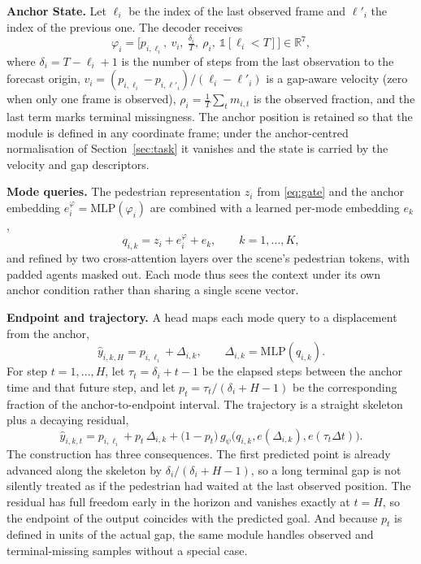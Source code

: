 \textbf{Anchor State.} Let $\ell_{i}$ be the index of the last observed frame and $\ell'_{i}$ the index of the previous one. The decoder receives
\begin{equation}
\varphi_{i}=\Big[p_{i,\ell_i},\ v_{i},\ \tfrac{\delta_{i}}{T},\ \rho_{i},\ \mathbb{1}[\ell_{i}<T]\Big]\in\mathbb{R}^{7},
\label{eq:anchor}
\end{equation}
where $\delta_{i}=T-\ell_{i}+1$ is the number of steps from the last observation to the forecast origin, $v_{i}=(p_{i,\ell_i}-p_{i,\ell'_i})/(\ell_i-\ell'_i)$ is a gap-aware velocity (zero when only one frame is observed), $\rho_{i}=\frac{1}{T}\sum_{t}m_{i,t}$ is the observed fraction, and the last term marks terminal missingness. The anchor position is retained so that the module is defined in any coordinate frame; under the anchor-centred normalisation of Section~\ref{sec:task} it vanishes and the state is carried by the velocity and gap descriptors.

\textbf{Mode queries.} The pedestrian representation $z_{i}$ from \eqref{eq:gate} and the anchor embedding $e^{\varphi}_{i}=\mathrm{MLP}(\varphi_{i})$ are combined with a learned per-mode embedding $e_{k}$,
\begin{equation}
q_{i,k}=z_{i}+e^{\varphi}_{i}+e_{k},\qquad k=1,\dots,K,
\label{eq:query}
\end{equation}
and refined by two cross-attention layers over the scene's pedestrian tokens, with padded agents masked out. Each mode thus sees the context under its own anchor condition rather than sharing a single scene vector.

\textbf{Endpoint and trajectory.} A head maps each mode query to a displacement from the anchor,
\begin{equation}
\hat{y}_{i,k,H}=p_{i,\ell_i}+\Delta_{i,k},\qquad \Delta_{i,k}=\mathrm{MLP}(q_{i,k}).
\label{eq:endpoint}
\end{equation}
For step $t=1,\dots,H$, let $\tau_{t}=\delta_{i}+t-1$ be the elapsed steps between the anchor time and that future step, and let $p_{t}=\tau_{t}/(\delta_{i}+H-1)$ be the corresponding fraction of the anchor-to-endpoint interval. The trajectory is a straight skeleton plus a decaying residual,
\begin{equation}
\hat{y}_{i,k,t}=p_{i,\ell_i}+p_{t}\,\Delta_{i,k}+\big(1-p_{t}\big)\,g_{\psi}\big(q_{i,k},e(\Delta_{i,k}),e(\tau_{t}\Delta t)\big).
\label{eq:traj}
\end{equation}
The construction has three consequences. The first predicted point is already advanced along the skeleton by $\delta_{i}/(\delta_{i}+H-1)$, so a long terminal gap is not silently treated as if the pedestrian had waited at the last observed position. The residual has full freedom early in the horizon and vanishes exactly at $t=H$, so the endpoint of the output coincides with the predicted goal. And because $p_{t}$ is defined in units of the actual gap, the same module handles observed and terminal-missing samples without a special case.

